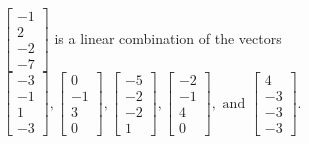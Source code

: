 \begin{exercise}
\begin{exerciseStatement}
  \end{exerciseStatement}
  \begin{exerciseAnswer}
   \(\left[\begin{array}{c}
-1 \\
2 \\
-2 \\
-7
\end{array}\right]\) 
  	 is  
	a linear combination of the vectors \(\left[\begin{array}{c}
-3 \\
-1 \\
1 \\
-3
\end{array}\right] , \left[\begin{array}{c}
0 \\
-1 \\
3 \\
0
\end{array}\right] , \left[\begin{array}{c}
-5 \\
-2 \\
-2 \\
1
\end{array}\right] , \left[\begin{array}{c}
-2 \\
-1 \\
4 \\
0
\end{array}\right] , \text{ and } \left[\begin{array}{c}
4 \\
-3 \\
-3 \\
-3
\end{array}\right]\).

	
  


  \end{exerciseAnswer}
\end{exercise}